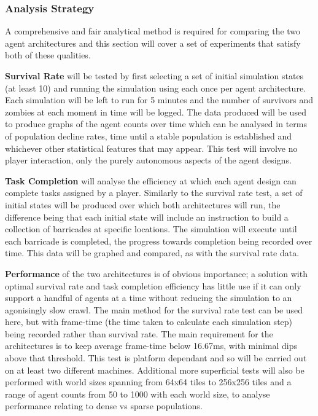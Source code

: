 \documentclass[a4paper,12pt]{article}
\begin{document}
\subsubsection{Analysis Strategy}\noindent
A comprehensive and fair analytical method is required for comparing the two agent architectures and this section will cover a set of experiments that satisfy both of these qualities.

\textbf{Survival Rate} will be tested by first selecting a set of initial simulation states (at least 10) and running the simulation using each once per agent architecture. Each simulation will be left to run for 5 minutes and the number of survivors and zombies at each moment in time will be logged. The data produced will be used to produce graphs of the agent counts over time which can be analysed in terms of population decline rates, time until a stable population is established and whichever other statistical features that may appear. This test will involve no player interaction, only the purely autonomous aspects of the agent designs.

\textbf{Task Completion} will analyse the efficiency at which each agent design can complete tasks assigned by a player. Similarly to the survival rate test, a set of initial states will be produced over which both architectures will run, the difference being that each initial state will include an instruction to build a collection of barricades at specific locations. The simulation will execute until each barricade is completed, the progress towards completion being recorded over time. This data will be graphed and compared, as with the survival rate data.

\textbf{Performance} of the two architectures is of obvious importance; a solution with optimal survival rate and task completion efficiency has little use if it can only support a handful of agents at a time without reducing the simulation to an agonisingly slow crawl. The main method for the survival rate test can be used here, but with frame-time (the time taken to calculate each simulation step) being recorded rather than survival rate. The main requirement for the architectures is to keep average frame-time below 16.67ms, with minimal dips above that threshold. This test is platform dependant and so will be carried out on at least two different machines. Additional more superficial tests will also be performed with world sizes spanning from 64x64 tiles to 256x256 tiles and a range of agent counts from 50 to 1000 with each world size, to analyse performance relating to dense vs sparse populations.
\end{document}
